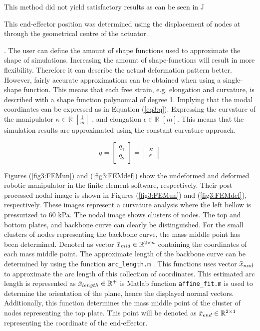 This method did not yield satisfactory results as can be seen in J

This end-effector position was determined using the displacement of nodes at through the geometrical centre of the actuator.


. The user can define the amount of shape functions used to approximate the shape of simulations. Increasing the amount of shape-functions will result in more flexibility. Therefore it can describe the actual deformation pattern better. However, fairly accurate approximations can be obtained when using a single-shape function. This means that each free strain, e.g. elongation and curvature, is described with a shape function polynomial of degree 1. Implying that the modal coordinates can be expressed as in Equation (\ref{eq3:q}). Expressing the curvature of the manipulator
 $\kappa \in \mathbb{R}$ $[\frac{1}{m}]$ . and elongation $\epsilon \in \mathbb{R}$ $[m]$.  This means that the simulation results are approximated using the constant curvature approach.

\begin{equation}
    q =  \begin{bmatrix} q_1 \\ q_2 \end{bmatrix}     = \begin{bmatrix} \kappa \\ \epsilon \end{bmatrix} 
    \label{eq3:q}
\end{equation}


Figures (\ref{fig3:FEMun}) and (\ref{fig3:FEMdef}) show the undeformed and deformed robotic manipulator in the finite element software, respectively. Their post-processed nodal image is shown in  Figures (\ref{fig3:FEMun}) and (\ref{fig3:FEMdef}), respectively. These images represent a curvature analysis where the left bellow is pressurized to 60 kPa. The nodal image shows clusters of nodes. The top and bottom plates, and backbone curve can clearly be distinguished. For the small clusters of nodes representing the backbone curve, the mass middle point has been determined. Denoted as vector  $\Bar{x}_{mid} \in \mathbb{R}^{2\times n}$ containing the coordinates of each mass middle point. The approximate length of the backbone curve can be determined by using the function \verb+arc_length.m+ \cite{arclength}. This functions uses vector $\Bar{x}_{mid}$  to approximate the arc length of this collection of coordinates. This estimated arc length is represented as  $\Bar{x}_{length} \in \mathbb{R}^+ $ is Matlab function \verb+affine_fit.m+ \cite{affinefit} is used to determine the orientation of the plane, hence the displayed normal vectors. Additionally, this function determines the mass middle point of the cluster of nodes representing the top plate. This point will be denoted as $\Bar{x}_{end} \in \mathbb{R}^{2\times 1}$representing the coordinate of the end-effector.

